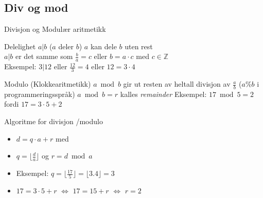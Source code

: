 \subsection{Div og mod}

\begin{frame}{Divisjon og Modulær aritmetikk}
       \begin{block}{Delelighet $a|b$ ($a$ deler $b$)}
              $a$ kan dele $b$ uten rest\\
              $a|b$ er det samme som $\frac{b}{a}=c$ eller $b=a\cdot c$ med $c \in \mathbb{Z}$\\
              Eksempel: $3|12$ eller $\frac{12}{3} = 4$ eller $12=3\cdot 4$
       \end{block}
       \pause
       \begin{block}{Modulo (Klokkearitmetikk)}
              $a \bmod b$ gir ut resten av heltall divisjon av $\frac{a}{b}$ ($a\%b$ i programmeringsspråk)
              $a \bmod b = r$ kalles \textit{remainder}
              Eksempel: $17 \bmod 5 = 2$ fordi $17 = 3 \cdot 5 + 2$ 
       \end{block}
\end{frame}

\begin{frame}[fragile]{Algoritme for divisjon /modulo}
       \begin{itemize}[<+->]
              \item $d=q\cdot a + r$ med
              \item $q=\big\lfloor{\frac{d}{a}}\big\rfloor$ og $r=d \bmod a$
              \item Eksempel: $q=\big\lfloor{\frac{17}{5}}\big\rfloor = \lfloor{3.4}\rfloor=3$
              \item $17=3\cdot 5 + r$ $\iff$ $17=15+r$ $\iff$ $r=2$
       \end{itemize}
\end{frame}

